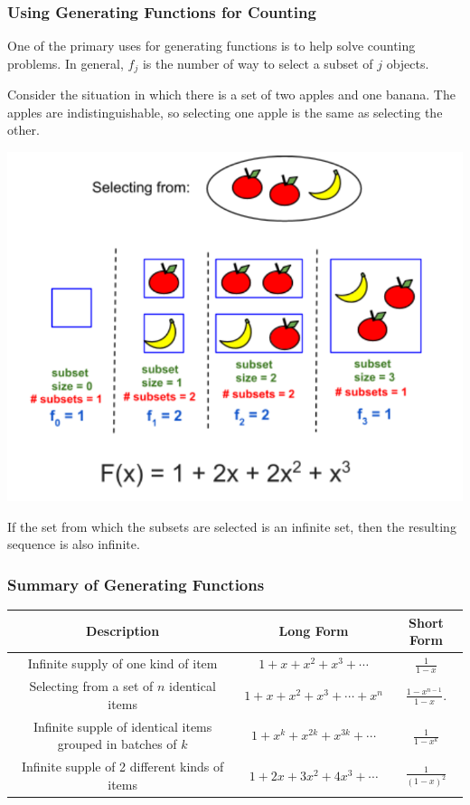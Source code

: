 \subsubsection*{Using Generating Functions for Counting}
One of the primary uses for generating functions is to help solve counting problems. In general, $f_j$ is the number of way to select a subset of $j$ objects.

Consider the situation in which there is a set of two apples and one banana. The apples are indistinguishable, so selecting one apple is the same as selecting the other.
\begin{center}
  \includegraphics[width=.6\linewidth]{resources/11_two_apple_one_banana.png}
\end{center}

If the set from which the subsets are selected is an infinite set, then the resulting sequence is also infinite.

\subsubsection*{Summary of Generating Functions}
\begin{center}
  \begin{tabular}{|c|c|c|}
    \hline
    Description                                                  & Long Form                            & Short Form                               \\
    \hline
    Infinite supply of one kind of item                          & $1 + x + x^2 + x^3 + \cdots$         & ${\displaystyle \frac{1}{1-x}}$          \\
    \hline
    Selecting from a set of $n$ identical items                  & $1 + x + x^2 + x^3 + \cdots + x^n$   & ${\displaystyle \frac{1-x^{n-1}}{1-x}}$. \\
    \hline
    Infinite supple of identical items grouped in batches of $k$ & $1 + x^k + x^{2k} + x^{3k} + \cdots$ & ${\displaystyle \frac{1}{1-x^k}}$        \\
    \hline
    Infinite supple of 2 different kinds of items                & $1 + 2x + 3x^2 + 4x^3 + \cdots$      & ${\displaystyle \frac{1}{(1-x)^2}}$      \\
    \hline
  \end{tabular}
\end{center}

